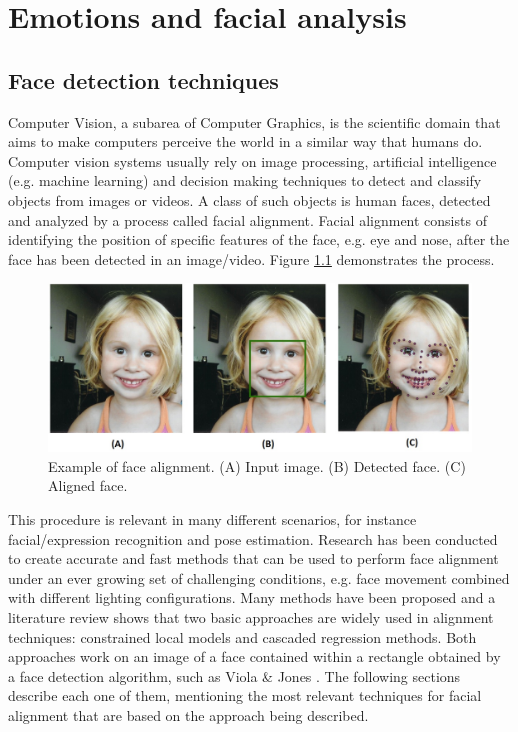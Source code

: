 \chapter{Emotions and facial analysis}

\section{Face detection techniques}
Computer Vision, a subarea of Computer Graphics, is the scientific domain that aims to make computers perceive the world in a similar way that humans do. Computer vision systems usually rely on image processing, artificial intelligence (e.g. machine learning) and decision making techniques to detect and classify objects from images or videos. A class of such objects is human faces, detected and analyzed by a process called facial alignment. Facial alignment consists of identifying the position of specific features of the face, e.g. eye and nose, after the face has been detected in an image/video. Figure \ref{fig:alignment} demonstrates the process.

\begin{figure}[ht]
    \centering
    \includegraphics[width=0.8\linewidth]{figures/face_alignment.jpg}
    \caption{Example of face alignment. (A) Input image. (B) Detected face. (C) Aligned face.}
    \label{fig:alignment}
\end{figure}

This procedure is relevant in many different scenarios, for instance facial/expression recognition and pose estimation. Research has been conducted to create accurate and fast methods that can be used to perform face alignment under an ever growing set of challenging conditions, e.g. face movement combined with different lighting configurations. Many methods have been proposed and a literature review shows that two basic approaches are widely used in alignment techniques: constrained local models and cascaded regression methods. Both approaches work on an image of a face contained within a rectangle obtained by a face detection algorithm, such as Viola \& Jones \parencite{viola2004robust}. The following sections describe each one of them, mentioning the most relevant techniques for facial alignment that are based on the approach being described.

